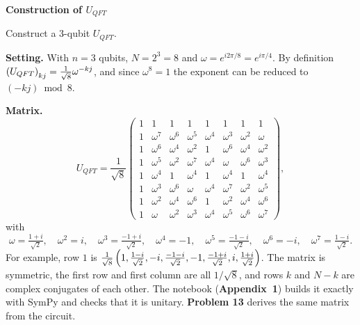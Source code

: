 \documentclass[a4paper, 10pt]{article}
\begin{document}
\begin{problem}
\textbf{Construction of \( U_{QFT} \)}
\par Construct a 3-qubit \( U_{QFT} \).
\end{problem}

\begin{solution}
	\noindent \textbf{Setting.} With \( n = 3 \) qubits, \( N = 2^3 = 8 \) and \( \omega = e^{i2\pi/8} = e^{i\pi/4} \). By definition \( \left(U_{QFT}\right)_{kj} = \tfrac{1}{\sqrt{8}}\omega^{-kj} \), and since \( \omega^8 = 1 \) the exponent can be reduced to \( (-kj) \bmod 8 \).

	\myspace

	\noindent \textbf{Matrix.}
	\[
		U_{QFT} = \frac{1}{\sqrt{8}}\begin{pmatrix}
			1 & 1        & 1        & 1        & 1        & 1        & 1        & 1        \\
			1 & \omega^7 & \omega^6 & \omega^5 & \omega^4 & \omega^3 & \omega^2 & \omega   \\
			1 & \omega^6 & \omega^4 & \omega^2 & 1        & \omega^6 & \omega^4 & \omega^2 \\
			1 & \omega^5 & \omega^2 & \omega^7 & \omega^4 & \omega   & \omega^6 & \omega^3 \\
			1 & \omega^4 & 1        & \omega^4 & 1        & \omega^4 & 1        & \omega^4 \\
			1 & \omega^3 & \omega^6 & \omega   & \omega^4 & \omega^7 & \omega^2 & \omega^5 \\
			1 & \omega^2 & \omega^4 & \omega^6 & 1        & \omega^2 & \omega^4 & \omega^6 \\
			1 & \omega   & \omega^2 & \omega^3 & \omega^4 & \omega^5 & \omega^6 & \omega^7
		\end{pmatrix},
	\]
	with
	\[
		\omega = \tfrac{1 + i}{\sqrt{2}}, \quad \omega^2 = i, \quad \omega^3 = \tfrac{-1 + i}{\sqrt{2}}, \quad \omega^4 = -1, \quad \omega^5 = \tfrac{-1 - i}{\sqrt{2}}, \quad \omega^6 = -i, \quad \omega^7 = \tfrac{1 - i}{\sqrt{2}}.
	\]
	For example, row \( 1 \) is \( \tfrac{1}{\sqrt{8}}\left(1, \tfrac{1 - i}{\sqrt{2}}, -i, \tfrac{-1 - i}{\sqrt{2}}, -1, \tfrac{-1 + i}{\sqrt{2}}, i, \tfrac{1 + i}{\sqrt{2}}\right) \).
	The matrix is symmetric, the first row and first column are all \( 1/\sqrt{8} \), and rows \( k \) and \( N - k \) are complex conjugates of each other.
	The notebook (\textbf{Appendix~1}) builds it exactly with SymPy and checks that it is unitary. \textbf{Problem 13} derives the same matrix from the circuit.
\end{solution}
\end{document}
